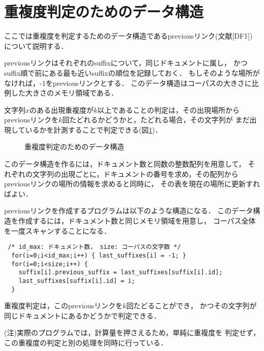 \section{重複度判定のためのデータ構造}

ここでは重複度を判定するためのデータ構造であるpreviousリンク(文献[DF1])
について説明する．

previousリンクはそれぞれのsuffixについて，同じドキュメントに属し，
かつsuffix順で前にある最も近いsuffixの順位を記録しておく．
もしそのような場所がなければ，-1をpreviousリンクとする．
このデータ構造はコーパスの大きさに比例した大きさのメモリ領域である．
\par

文字列$x$のある出現重複度が$k$以上であることの判定は，その出現場所から
previousリンクを$k$回たどれるかどうかと，たどれる場合，その文字列が
まだ出現しているかを計測することで判定できる(図\ref{chofuku_struct})．\par

 \begin{figure}[htbp]
  \begin{center}
   \epsfxsize=12cm
   
   \caption{重複度判定のためのデータ構造}
   \label{chofuku_struct}
  \end{center}
 \end{figure}

このデータ構造を作るには，ドキュメント数と同数の整数配列を用意して，
それぞれの文字列の出現ごとに，ドキュメントの番号を求め，その配列から
previousリンクの場所の情報を求めると同時に，
その表を現在の場所に更新すればよい．
\par
previousリンクを作成するプログラムは以下のような構造になる．
このデータ構造を作成するには，ドキュメント数と同じメモリ領域を用意し，
コーパス全体を一度スキャンすることになる．

\begin{verbatim}
 /* id_max: ドキュメント数， size: コーパスの文字数 */
  for(i=0;i<id_max;i++) { last_suffixes[i] = -1; }
  for(i=0;i<size;i++) {
    suffix[i].previous_suffix = last_suffixes[suffix[i].id];
    last_suffixes[suffix[i].id] = i;
  }
\end{verbatim}

重複度判定は，このpreviousリンクを$k$回たどることができ，
かつその文字列が同じドキュメントにあるかどうかで判定できる．

(注)実際のプログラムでは，計算量を押さえるため，単純に重複度を
判定せず，この重複度の判定と別の処理を同時に行っている．

